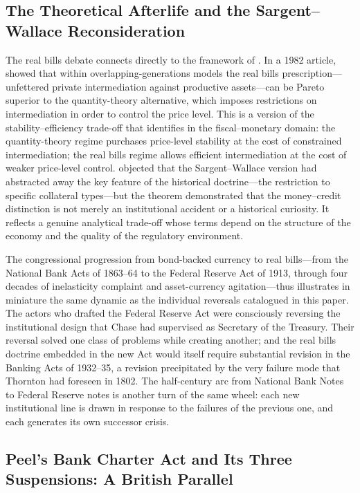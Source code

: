 \documentclass[12pt]{article}
\begin{document}
\subsection{The Theoretical Afterlife and the Sargent--Wallace
            Reconsideration}

The real bills debate connects directly to the framework of
\citet{Sargent2011}.  In a 1982 article, \citet{SargentWallace1982}
showed that within overlapping-generations models the real bills
prescription---unfettered private intermediation against productive
assets---can be Pareto superior to the quantity-theory alternative,
which imposes restrictions on intermediation in order to control the
price level.  This is a version of the stability--efficiency trade-off
that \citet{Sargent2011} identifies in the fiscal--monetary domain:
the quantity-theory regime purchases price-level stability at the cost
of constrained intermediation; the real bills regime allows efficient
intermediation at the cost of weaker price-level control.
\citet{Laidler1984} objected that the Sargent--Wallace version had
abstracted away the key feature of the historical doctrine---the
restriction to specific collateral types---but the theorem demonstrated
that the money--credit distinction is not merely an institutional
accident or a historical curiosity.  It reflects a genuine analytical
trade-off whose terms depend on the structure of the economy and the
quality of the regulatory environment.

The congressional progression from bond-backed currency to real
bills---from the National Bank Acts of 1863--64 to the Federal Reserve
Act of 1913, through four decades of inelasticity complaint and
asset-currency agitation---thus illustrates in miniature the same
dynamic as the individual reversals catalogued in this paper.  The
actors who drafted the Federal Reserve Act were consciously reversing
the institutional design that Chase had supervised as Secretary of the
Treasury.  Their reversal solved one class of problems while creating
another; and the real bills doctrine embedded in the new Act would
itself require substantial revision in the Banking Acts of 1932--35,
a revision precipitated by the very failure mode that Thornton had
foreseen in 1802.  The half-century arc from National Bank Notes to
Federal Reserve notes is another turn of the same wheel: each new
institutional line is drawn in response to the failures of the previous
one, and each generates its own successor crisis.

\subsection{Peel's Bank Charter Act and Its Three Suspensions:
            A British Parallel}
\label{subsec:peel}
\end{document}
